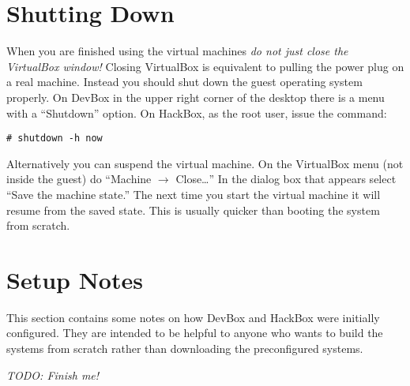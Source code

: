 \documentclass[twocolumn]{article}
\begin{document}
\section{Shutting Down}

When you are finished using the virtual machines \emph{do not just close the VirtualBox window!}
Closing VirtualBox is equivalent to pulling the power plug on a real machine. Instead you should
shut down the guest operating system properly. On DevBox in the upper right corner of the
desktop there is a menu with a ``Shutdown'' option. On HackBox, as the root user, issue the
command:
\begin{Verbatim}
# shutdown -h now
\end{Verbatim}

Alternatively you can suspend the virtual machine. On the VirtualBox menu (not inside the guest)
do ``Machine $\rightarrow$ Close\ldots'' In the dialog box that appears select ``Save the
machine state.'' The next time you start the virtual machine it will resume from the saved
state. This is usually quicker than booting the system from scratch.

\section{Setup Notes}

This section contains some notes on how DevBox and HackBox were initially configured. They are
intended to be helpful to anyone who wants to build the systems from scratch rather than
downloading the preconfigured systems.

\textit{TODO: Finish me!}
\end{document}
